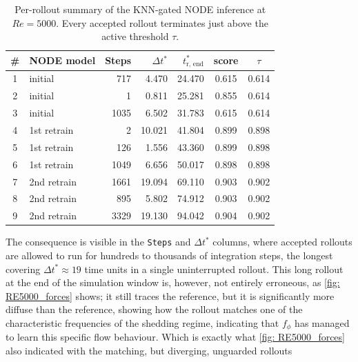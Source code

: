 \begin{table}[htbp]
  \centering
  \footnotesize
  \setlength{\tabcolsep}{4pt}
  \renewcommand{\arraystretch}{0.85}
  \begin{tabular}{clrrrcc}
    \toprule
    \# & NODE model & Steps & $\Delta t^*$ & $t^*_\text{r, end}$ & score & $\tau$ \\
    \midrule
    1 & initial      & 717  & 4.470  & 24.470 & 0.615 & 0.614 \\
    2 & initial      & 1    & 0.811  & 25.281 & 0.855 & 0.614 \\
    3 & initial      & 1035 & 6.502  & 31.783 & 0.615 & 0.614 \\
    \midrule
    4 & 1st retrain  & 2    & 10.021 & 41.804 & 0.899 & 0.898 \\
    5 & 1st retrain  & 126  & 1.556  & 43.360 & 0.899 & 0.898 \\
    6 & 1st retrain  & 1049 & 6.656  & 50.017 & 0.898 & 0.898 \\
    \midrule
    7 & 2nd retrain  & 1661 & 19.094 & 69.110 & 0.903 & 0.902 \\
    8 & 2nd retrain  & 895  & 5.802  & 74.912 & 0.903 & 0.902 \\
    9 & 2nd retrain  & 3329 & 19.130 & 94.042 & 0.904 & 0.902 \\
    \bottomrule
  \end{tabular}
  \caption{Per-rollout summary of the KNN-gated NODE inference at $Re = 5000$. Every accepted rollout terminates just above the active threshold $\tau$.}
  \label{tab: re5000_rollout_summary}
\end{table}

The consequence is visible in the \texttt{Steps} and $\Delta t^*$ columns, where accepted rollouts are allowed to run for hundreds to thousands of integration steps, the longest covering $\Delta t^* \approx 19$ time units in a single uninterrupted rollout. This long rollout at the end of the simulation window is, however, not entirely erroneous, as \autoref{fig: RE5000_forces} shows; it still traces the reference, but it is significantly more diffuse than the reference, showing how the rollout matches one of the characteristic frequencies of the shedding regime, indicating that $f_\phi$ has managed to learn this specific flow behaviour. Which is exactly what \autoref{fig: RE5000_forces} also indicated with the matching, but diverging, unguarded rollouts

